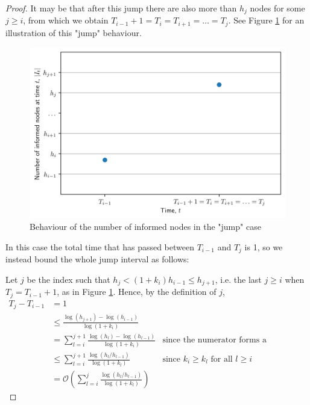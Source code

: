 \begin{proof}
	It may be that after this jump there are also more than $h_j$ nodes for some $j \geq i$, %
	from which we obtain $T_{i-1} + 1 = T_i = T_{i+1} = \dots = T_j$. See Figure \ref{fig:floodingJump} for an illustration of this "jump" behaviour. 
	\begin{figure}[h]
		\centering
		\includegraphics[width=1\textwidth]{./figures/flooding_jump.png}
		\caption{Behaviour of the number of informed nodes in the "jump" case}
		\label{fig:floodingJump}
	\end{figure}
	In this case the total time that has passed between $T_{i-1}$ and $T_j$ is 1, so we instead bound the whole jump interval as follows:
	
	Let $j$ be the index such that $h_j < (1+k_i)h_{i-1} \leq h_{j+1}$, i.e. the last $j \geq i$ when $T_j = T_{i-1} + 1$, as in Figure \ref{fig:floodingJump}. %
	Hence, by the definition of $j$,
	\begin{align*}
		T_j - T_{i-1} &=1 \\ 
		&\leq \frac{\log (h_{j+1}) - \log(h_{i-1})}{\log(1+k_i) } \\
		& =\sum_{l=i}^{j+1} \frac{\log (h_{l}) - \log(h_{l-1})}{\log(1+k_i) } & \text{since the numerator forms a telescoping sum} \\
		& \leq \sum_{l=i}^{j+1} \frac{\log (h_{l}/h_{l-1})}{\log(1+k_l) } & \text{since } k_i \geq k_l \text{ for all } l \geq i \\
		& = \mathcal{O}\left(\sum_{l=i}^j \frac{\log (h_{l}/h_{l-1})}{\log(1+k_l) }\right)
 	\end{align*}


\end{proof}
